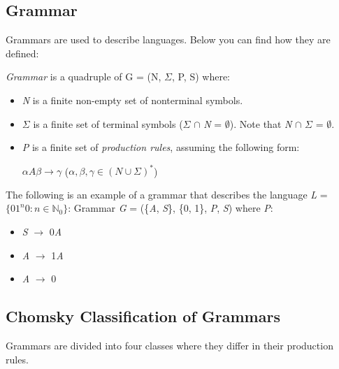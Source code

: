 \subsection{Grammar}

Grammars are used to describe languages. Below you can find how they are defined:

\begin{definition}
    \textit{Grammar} is a quadruple of G = (N, $\Sigma$, P, S) where:
\end{definition}
\begin{itemize}
    \item \textit{N} is a finite non-empty set of nonterminal symbols.
    \item $\Sigma$ is a finite set of terminal symbols ($\Sigma$ $\cap$ \textit{N} = $\emptyset$). Note that \textit{N} $\cap$ $\Sigma$ = $\emptyset$.
    \item \textit{P} is a finite set of \textit{production rules}, assuming the following form:\\

    \centerline{$\alpha\textit{A}\beta \rightarrow \gamma$ ($\alpha, \beta, \gamma \in (\textit{N} \cup \Sigma)^*$)}
\end{itemize}

The following is an example of a grammar that describes the language \textit{L} = $\{01^\textit{n}0 : \textit{n} \in \mathbb{N}_0\}$:
Grammar \textit{G} = (\{\textit{A}, \textit{S}\}, \{0, 1\}, \textit{P}, \textit{S}) where \textit{P}:
\begin{itemize}
    \item \textit{S} $\rightarrow$ 0\textit{A}
    \item \textit{A} $\rightarrow$ 1\textit{A}
    \item \textit{A} $\rightarrow$ 0
\end{itemize}

\subsection{Chomsky Classification of Grammars}

Grammars are divided into four classes where they differ in their production rules. 

